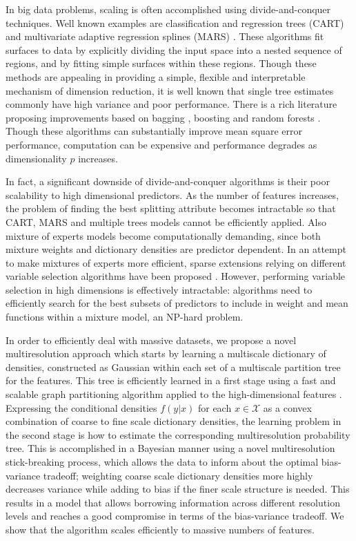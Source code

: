 \documentclass{article}
\begin{document}
In big data problems, scaling is often accomplished using divide-and-conquer techniques. Well known examples are classification and regression trees (CART) \cite{CART} and multivariate adaptive regression splines (MARS) \cite{MARS}. These algorithms fit surfaces to data by explicitly dividing the input space into a nested sequence of regions, and by fitting simple surfaces  within these regions. Though these methods are appealing in providing a simple, flexible and interpretable mechanism of dimension reduction, it is well known that single tree estimates commonly have high variance and poor performance.  There is a rich literature proposing improvements based on bagging \cite{Bagging}, boosting \cite{Boosting} and random forests \cite{RandomForest}. Though these algorithms can substantially improve mean square error performance, computation can be expensive and performance degrades as dimensionality $p$ increases.

In fact, a significant downside of divide-and-conquer algorithms is their poor scalability to high dimensional predictors. As the number of features increases, the problem of finding the best splitting attribute becomes intractable so that CART, MARS and multiple trees models cannot be efficiently applied. Also mixture of experts models become computationally demanding, since both mixture weights and dictionary densities are predictor dependent. In an attempt to make mixtures of experts more efficient, sparse extensions relying on different variable selection algorithms have been proposed \cite{SparseMoF}. However, performing variable selection in high dimensions is effectively intractable: algorithms need to efficiently search for the best subsets of predictors to include in weight and mean functions within a mixture model, an NP-hard problem.

 In order to efficiently deal with massive datasets, we propose a novel multiresolution approach which starts by learning a multiscale dictionary of densities, constructed as Gaussian within each set of a multiscale partition tree for the features. This tree is efficiently learned in a first stage using a fast and scalable graph partitioning algorithm applied to the high-dimensional features \cite{metis}.  Expressing the conditional densities $f(y|x)$ for each $x \in \mathcal{X}$ as a convex combination of coarse to fine scale dictionary densities, the learning problem in the second stage is how to estimate the corresponding multiresolution probability tree.  This is accomplished in a Bayesian manner using a novel multiresolution stick-breaking process, which allows the data to inform about the optimal bias-variance tradeoff; weighting coarse scale dictionary densities more highly decreases variance while adding to bias if the finer scale structure is needed.  This results in a model that allows borrowing information across different resolution levels and reaches a good compromise in terms of the bias-variance tradeoff. We show that the algorithm scales efficiently to massive numbers of features. 
\end{document}
